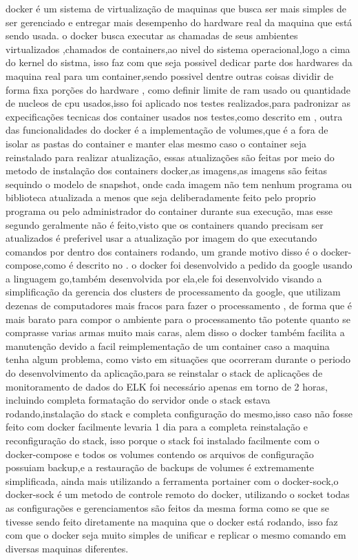 \documentclass[
	12pt,				%
	openright,			%
	oneside,			%
	a4paper,			%
	english,			%
	french,				%
	spanish,			%
	brazil,				%
	]{abntex2}
\begin{document}
docker é um sistema de virtualização de maquinas que busca ser mais simples de ser gerenciado e entregar mais desempenho do hardware real da maquina que está sendo usada.
o docker busca executar as chamadas de seus ambientes virtualizados ,chamados de containers,ao nivel do sistema operacional,logo a cima do kernel do sistma,
isso faz com que seja possivel dedicar parte dos hardwares da maquina real para um container,sendo possivel dentre outras coisas dividir de forma fixa porções do hardware ,
como definir limite de ram usado ou quantidade de nucleos de cpu usados,isso foi aplicado nos testes realizados,para padronizar as expecificações tecnicas dos container usados nos testes,como descrito em ,
outra das funcionalidades do docker é a implementação de volumes,que é a fora de isolar as pastas do container e manter elas mesmo caso o container seja reinstalado para realizar atualização,
essas atualizações são feitas por meio do metodo de instalação dos containers docker,as imagens,as imagens são feitas sequindo o modelo de snapshot,
onde cada imagem não tem nenhum programa ou biblioteca atualizada a menos que seja deliberadamente feito pelo proprio programa ou pelo administrador do container durante sua execução,
mas esse segundo geralmente não é feito,visto que os containers quando precisam ser atualizados é preferivel usar a atualização por imagem do que executando comandos por dentro dos containers rodando,
um grande motivo disso é o docker-compose,como é descrito no .
o docker foi desenvolvido a pedido da google usando a linguagem go,também desenvolvida por ela,ele foi desenvolvido visando a simplificação da gerencia dos clusters de processamento da google,
que utilizam dezenas de computadores mais fracos para fazer o processamento ,
de forma que é mais barato para compor o ambiente para o processamento tão potente quanto se comprasse varias armas muito mais caras,
alem disso o docker também facilita a manutenção devido a facil reimplementação de um container caso a maquina tenha algum problema,
como visto em situações que ocorreram durante o periodo do desenvolvimento da aplicação,para se reinstalar o stack de aplicações de monitoramento de dados do ELK  foi necessário apenas em torno de 2 horas,
incluindo completa formatação do servidor onde o stack estava rodando,instalação do stack e completa configuração do mesmo,isso caso não fosse feito com docker facilmente levaria 1 dia para a completa reinstalação e reconfiguração do stack,
isso porque o stack foi instalado facilmente com o docker-compose e todos os volumes contendo os arquivos de configuração possuiam backup,e a restauração de backups de volumes é extremamente simplificada,
ainda mais utilizando a ferramenta portainer  com o docker-sock,o docker-sock é um metodo de controle remoto do docker,
utilizando o socket todas as configurações e gerenciamentos são feitos da mesma forma como se que se tivesse sendo feito diretamente na maquina que o docker está rodando,
isso faz com que o docker seja muito simples de unificar e replicar o mesmo comando em diversas maquinas diferentes.
\cite{dockerdoc}
\end{document}
